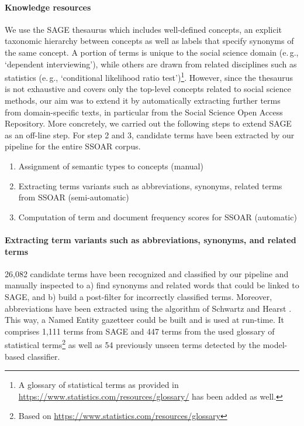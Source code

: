 \paragraph{Knowledge resources}%
We use the SAGE thesaurus which includes well-defined concepts, an explicit taxonomic hierarchy between concepts as well as labels that specify synonyms of the same concept.
A portion of terms is unique to the social science domain (e.\,g.,  `dependent interviewing'), while others are drawn from related disciplines such as statistics (e.\,g., `conditional likelihood ratio test')\footnote{A glossary of statistical terms as provided in \url{https://www.statistics.com/resources/glossary/} has been added as well.}.
However, since the thesaurus is not exhaustive and covers only the top-level concepts related to social science methods, our aim was to extend it by automatically extracting further terms from domain-specific texts, in particular from the Social Science Open Access Repository.
More concretely, we carried out the following steps to extend SAGE as an off-line step. For step 2 and 3, candidate terms have been extracted by our pipeline for the entire SSOAR corpus. 
\begin{enumerate}
\item Assignment of semantic types to concepts (manual) 
\item Extracting terms variants such as abbreviations, synonyms, related terms from SSOAR (semi-automatic)
\item Computation of term and document frequency scores for SSOAR (automatic)
\end{enumerate}

\paragraph{Extracting term variants such as abbreviations, synonyms, and related terms}%
26,082 candidate terms have been recognized and classified by our pipeline and manually inspected to  
a) find synonyms and related words that could be linked to SAGE, and
b) build a post-filter for incorrectly classified terms. 
Moreover, abbreviations have been extracted using the algorithm of Schwartz and Hearst
\cite{SchwartzH03}.
This way, a Named Entity gazetteer could be built and is used at run-time. It comprises 1,111 terms from SAGE and 447 terms from the used glossary of statistical terms\footnote{Based on \url{https://www.statistics.com/resources/glossary}} as well as 54 previously unseen terms detected by the model-based classifier. 




